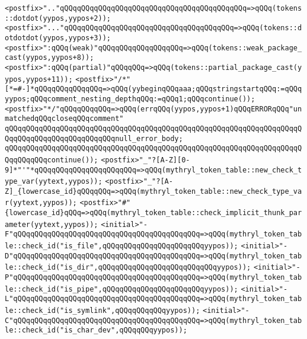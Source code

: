 \verb|<postfix>".."qQQqqQQqqQQqqQQqqQQqqQQqqQQqqQQqqQQqqQQqqQQq=>qQQq(tokens::dotdot(yypos,yypos+2));|\newline
\verb|<postfix>"..."qQQqqQQqqQQqqQQqqQQqqQQqqQQqqQQqqQQqqQQq=>qQQq(tokens::dotdotdot(yypos,yypos+3));|\newline
\verb|<postfix>":qQQq(weak)"qQQqqQQqqQQqqQQqqQQq=>qQQq(tokens::weak_package_cast(yypos,yypos+8));|\newline
\verb|<postfix>":qQQq(partial)"qQQqqQQq=>qQQq(tokens::partial_package_cast(yypos,yypos+11));|\newline
\verb|<postfix>"/*"[*=#-]*qQQqqQQqqQQqqQQq=>qQQq(yybeginqQQqaaa;qQQqstringstartqQQq:=qQQqyypos;qQQqcomment_nesting_depthqQQq:=qQQq1;qQQqcontinue());|\newline
\verb|<postfix>"*/"qQQqqQQqqQQq=>qQQq(errqQQq(yypos,yypos+1)qQQqERRORqQQq"unmatchedqQQqcloseqQQqcomment"|\newline
\verb|qQQqqQQqqQQqqQQqqQQqqQQqqQQqqQQqqQQqqQQqqQQqqQQqqQQqqQQqqQQqqQQqqQQqqQQqqQQqqQQqqQQqqQQqqQQqqQQqnull_error_body;|\newline
\verb|qQQqqQQqqQQqqQQqqQQqqQQqqQQqqQQqqQQqqQQqqQQqqQQqqQQqqQQqqQQqqQQqqQQqqQQqqQQqqQQqcontinue());|\newline
\verb|<postfix>"_"?[A-Z][0-9]*"'"*qQQqqQQqqQQqqQQqqQQqqQQq=>qQQq(mythryl_token_table::new_check_type_var(yytext,yypos));|\newline
\verb|<postfix>"_"?[A-Z]_{lowercase_id}qQQqqQQq=>qQQq(mythryl_token_table::new_check_type_var(yytext,yypos));|\newline
\verb|<postfix>"#"{lowercase_id}qQQq=>qQQq(mythryl_token_table::check_implicit_thunk_parameter(yytext,yypos));|\newline
\verb|<initial>"-F"qQQqqQQqqQQqqQQqqQQqqQQqqQQqqQQqqQQqqQQqqQQq=>qQQq(mythryl_token_table::check_id("is_file",qQQqqQQqqQQqqQQqqQQqqQQqyypos));|\newline
\verb|<initial>"-D"qQQqqQQqqQQqqQQqqQQqqQQqqQQqqQQqqQQqqQQqqQQq=>qQQq(mythryl_token_table::check_id("is_dir",qQQqqQQqqQQqqQQqqQQqqQQqqQQqyypos));|\newline
\verb|<initial>"-P"qQQqqQQqqQQqqQQqqQQqqQQqqQQqqQQqqQQqqQQqqQQq=>qQQq(mythryl_token_table::check_id("is_pipe",qQQqqQQqqQQqqQQqqQQqqQQqyypos));|\newline
\verb|<initial>"-L"qQQqqQQqqQQqqQQqqQQqqQQqqQQqqQQqqQQqqQQqqQQq=>qQQq(mythryl_token_table::check_id("is_symlink",qQQqqQQqqQQqyypos));|\newline
\verb|<initial>"-C"qQQqqQQqqQQqqQQqqQQqqQQqqQQqqQQqqQQqqQQqqQQq=>qQQq(mythryl_token_table::check_id("is_char_dev",qQQqqQQqyypos));|\newline
